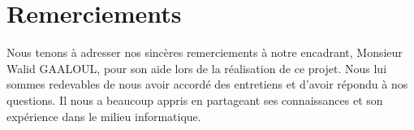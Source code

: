 \chapter{Remerciements}

Nous tenons à adresser nos sincères remerciements à notre encadrant, Monsieur Walid GAALOUL, pour son aide lors de la réalisation de ce projet. Nous lui sommes redevables de nous avoir accordé des entretiens et d'avoir répondu à nos questions. Il nous a beaucoup appris en partageant ses connaissances et son expérience dans le milieu informatique.